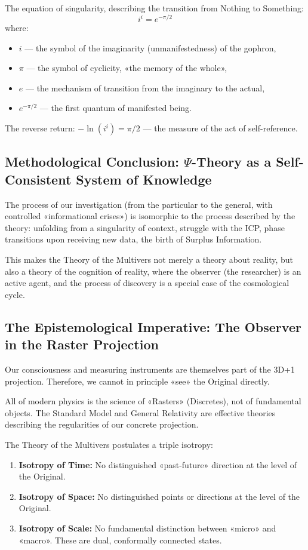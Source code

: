 \documentclass[a4paper,12pt]{article}
\begin{document}
	The equation of singularity, describing the transition from Nothing to Something:
	\[
	i^i = e^{-\pi/2}
	\]
	where:
	\begin{itemize}
		\item $i$ — the symbol of the imaginarity (unmanifestedness) of the gophron,
		\item $\pi$ — the symbol of cyclicity, «the memory of the whole»,
		\item $e$ — the mechanism of transition from the imaginary to the actual,
		\item $e^{-\pi/2}$ — the first quantum of manifested being.
	\end{itemize}
	
	The reverse return: $-\ln(i^i) = \pi/2$ — the measure of the act of self-reference.
	
	\subsection{Methodological Conclusion: $\Psi$-Theory as a Self-Consistent System of Knowledge}
	
	The process of our investigation (from the particular to the general, with controlled «informational crises») is isomorphic to the process described by the theory: unfolding from a singularity of context, struggle with the ICP, phase transitions upon receiving new data, the birth of Surplus Information.
	
	This makes the Theory of the Multivers not merely a theory about reality, but also a theory of the cognition of reality, where the observer (the researcher) is an active agent, and the process of discovery is a special case of the cosmological cycle.
	
	\subsection{The Epistemological Imperative: The Observer in the Raster Projection}
	
	Our consciousness and measuring instruments are themselves part of the 3D+1 projection. Therefore, we cannot in principle «see» the Original directly.
	
	All of modern physics is the science of «Rasters» (Discretes), not of fundamental objects. The Standard Model and General Relativity are effective theories describing the regularities of our concrete projection.
	
	The Theory of the Multivers postulates a triple isotropy:
	\begin{enumerate}
		\item \textbf{Isotropy of Time:} No distinguished «past-future» direction at the level of the Original.
		\item \textbf{Isotropy of Space:} No distinguished points or directions at the level of the Original.
		\item \textbf{Isotropy of Scale:} No fundamental distinction between «micro» and «macro». These are dual, conformally connected states.
	\end{enumerate}
	
\end{document}
